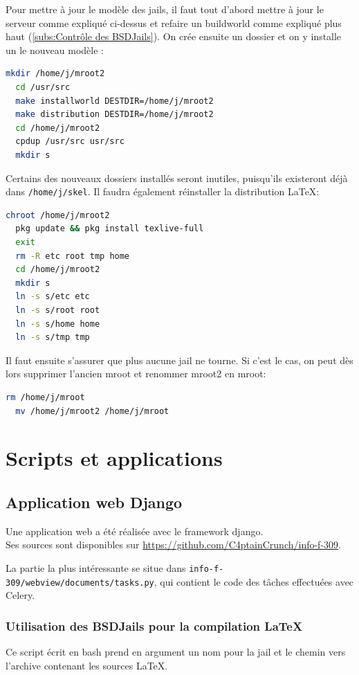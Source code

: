 \documentclass[10pt,a4paper]{article}
\begin{document}
Pour mettre à jour le modèle des jails, il faut tout d'abord mettre à jour le serveur comme expliqué ci-dessus et refaire un buildworld comme expliqué plus haut (\ref{subs:Contrôle des BSDJails}). On crée ensuite un dossier et on y installe un le nouveau modèle :
\begin{lstlisting}[language=bash]
  mkdir /home/j/mroot2
  cd /usr/src
  make installworld DESTDIR=/home/j/mroot2
  make distribution DESTDIR=/home/j/mroot2
  cd /home/j/mroot2
  cpdup /usr/src usr/src
  mkdir s
\end{lstlisting}
Certains des nouveaux dossiers installés seront inutiles, puisqu'ils existeront déjà dans \texttt{/home/j/skel}. Il faudra également réinstaller la distribution \LaTeX :
\begin{lstlisting}[language=bash]
  chroot /home/j/mroot2
  pkg update && pkg install texlive-full
  exit
  rm -R etc root tmp home
  cd /home/j/mroot2
  mkdir s
  ln -s s/etc etc
  ln -s s/root root
  ln -s s/home home
  ln -s s/tmp tmp
\end{lstlisting}
Il faut ensuite s'assurer que plus aucune jail ne tourne. Si c'est le cas, on peut dès lors supprimer l'ancien mroot et renommer mroot2 en mroot:
\begin{lstlisting}[language=bash]
  rm /home/j/mroot
  mv /home/j/mroot2 /home/j/mroot
\end{lstlisting}

\section{Scripts et applications}
\label{sec:Scripts et applications}

\subsection{Application web Django}
Une application web a été réalisée avec le framework django.\\ Ses sources sont disponibles sur \url{https://github.com/C4ptainCrunch/info-f-309}.

La partie la plus intéressante se situe dans \texttt{info-f-309/webview/documents/tasks.py}, qui contient le code des tâches effectuées avec Celery.


\subsubsection{Utilisation des BSDJails pour la compilation \LaTeX}
Ce script écrit en bash prend en argument un nom pour la jail et le chemin vers l'archive contenant les sources \LaTeX.

\end{document}
